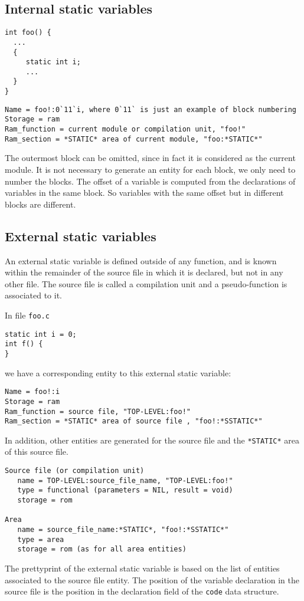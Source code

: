 \documentclass[a4paper]{report}
\begin{document}
\subsection{Internal static variables}

\begin{lstlisting}
int foo() {
  ...
  {
     static int i;
     ...
  } 
}  
\end{lstlisting}

\begin{verbatim}
Name = foo!:0`11`i, where 0`11` is just an example of block numbering 
Storage = ram 
Ram_function = current module or compilation unit, "foo!"
Ram_section = *STATIC* area of current module, "foo:*STATIC*"
\end{verbatim}
The outermost block can be omitted, since in fact it is considered as
 the current module. It is not necessary to generate an entity for
 each block, we only need to number the blocks. The offset of a
 variable is computed from the declarations of variables in the same
 block. So variables with the same offset but in different blocks are
 different.

\subsection{External static variables}

An external static variable is defined outside of any function, and is
 known within the remainder of the source file in which it is
 declared, but not in any other file. The source file is called a
 compilation unit and a pseudo-function is associated to it.

In file \texttt{foo.c}
\begin{lstlisting}
static int i = 0; 
int f() {
}
\end{lstlisting}
we have a corresponding entity to this external static variable:
\begin{verbatim}
Name = foo!:i
Storage = ram 
Ram_function = source file, "TOP-LEVEL:foo!"
Ram_section = *STATIC* area of source file , "foo!:*SSTATIC*"
\end{verbatim}
In addition, other entities are generated for the source file and the 
\texttt{*STATIC*} area of this source file.
\begin{verbatim}
Source file (or compilation unit)
   name = TOP-LEVEL:source_file_name, "TOP-LEVEL:foo!"
   type = functional (parameters = NIL, result = void)
   storage = rom

Area
   name = source_file_name:*STATIC*, "foo!:*SSTATIC*"
   type = area
   storage = rom (as for all area entities)
\end{verbatim}
 The prettyprint of the external static variable is based on the list
 of entities associated to the source file entity. The position of the
 variable declaration in the source file is the position in the
 declaration field of the \verb/code/ data structure.
\end{document}
